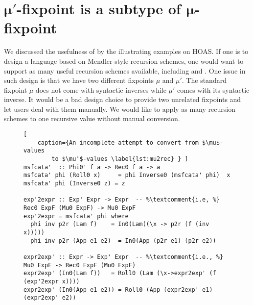 \section{$\pmb{\mu'}$-fixpoint is a subtype of $\pmb{\mu}$-fixpoint}\label{sec:murec}
We discussed the usefulness of \msfit{} by the illustrating examples on HOAS.
If one is to design a language based on Mendler-style recursion schemes,
one would want to support as many useful recursion schemes available,
including \MIt{} and \msfit{}. One issue in such design is that we have
two different fixpoints $\mu$ and $\mu'$. The standard fixpoint $\mu$
does not come with syntactic inverses while $\mu'$ comes with
its syntactic inverse. It would be a bad design choice to provide 
two unrelated fixpoints and let users deal with them manually.
We would like to apply as many recursion schemes to one recursive value
without manual conversion.

\begin{figure}

\begin{lstlisting}[
	caption={An incomplete attempt to convert from $\mu$-values
		to $\mu'$-values \label{lst:mu2rec} } ]
msfcata'  :: Phi0' f a -> Rec0 f a -> a
msfcata' phi (Roll0 x)     = phi Inverse0 (msfcata' phi)  x
msfcata' phi (Inverse0 z) = z

exp'2expr :: Exp' Expr -> Expr  -- %\textcomment{i.e, %} Rec0 ExpF (Mu0 ExpF) -> Mu0 ExpF
exp'2expr = msfcata' phi where
  phi inv p2r (Lam f)    = In0(Lam((\x -> p2r (f (inv x)))))
  phi inv p2r (App e1 e2)  = In0(App (p2r e1) (p2r e2))

expr2exp' :: Expr -> Exp' Expr  -- %\textcomment{i.e., %} Mu0 ExpF -> Rec0 ExpF (Mu0 ExpF)
expr2exp' (In0(Lam f))   = Roll0 (Lam (\x->expr2exp' (f (exp'2expr x))))
expr2exp' (In0(App e1 e2)) = Roll0 (App (expr2exp' e1) (expr2exp' e2))
\end{lstlisting}
\vspace*{-3ex}
\end{figure}

